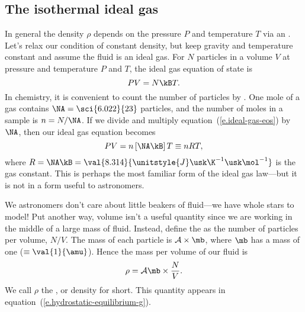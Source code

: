 \subsection{The isothermal ideal gas}\label{s.ideal-gas}

In general the density $\rho$ depends on the pressure $P$ and temperature $T$ via an . Let's relax our condition of constant density, but keep gravity and temperature constant and assume the fluid is an ideal gas. For $N$ particles in a volume $V$ at pressure and temperature $P$ and $T$, the ideal gas equation of state is
\begin{equation}\label{e.ideal-gas-eos}
PV = N\kB T.
\end{equation}
In chemistry, it is convenient to count the number of particles by . One mole of a gas contains $\NA = \sci{6.022}{23}$ particles, and the number of moles in a sample is $n = N/\NA$.  If we divide and multiply equation~(\ref{e.ideal-gas-eos}) by $\NA$, then our ideal gas equation becomes
\[ PV = n\left[\NA \kB\right]T \equiv n R T, \]
where $R = \NA\kB = \val{8.314}{\unitstyle{J}\usk\K^{-1}\usk\mol^{-1}}$ is the gas constant. This is perhaps the most familiar form of the ideal gas law---but it is not in a form useful to astronomers.

We astronomers don't care about little beakers of fluid---we have whole stars to model! Put another way, volume isn't a useful quantity since we are working in the middle of a large mass of fluid. Instead, define the  as the number of particles per volume, $N/V$. The mass of each particle is $\mathcal{A}\times\mb$, where $\mb$ has a mass of one  ($\equiv\val{1}{\amu}$). Hence the mass per volume of our fluid is
\[
	\rho = \mathcal{A}\mb \times\frac{N}{V}.
\]
We call $\rho$ the , or density for short. This quantity appears in equation~(\ref{e.hydrostatic-equilibrium-g}).

